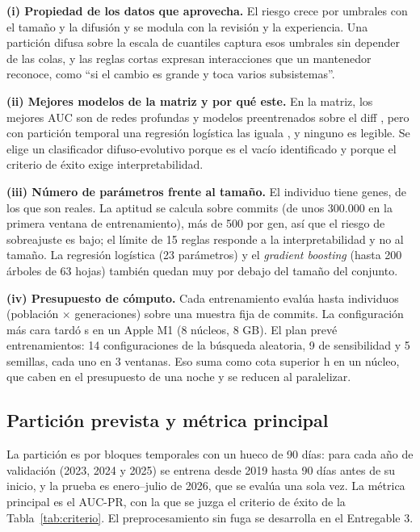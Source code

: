 \textbf{(i) Propiedad de los datos que aprovecha.} El riesgo crece por umbrales con el tamaño y la difusión y se modula con la revisión y la experiencia. Una partición difusa sobre la escala de cuantiles captura esos umbrales sin depender de las colas, y las reglas cortas expresan interacciones que un mantenedor reconoce, como ``si el cambio es grande y toca varios subsistemas''.

\textbf{(ii) Mejores modelos de la matriz y por qué este.} En la matriz, los mejores AUC son de redes profundas y modelos preentrenados sobre el diff \cite{Ni2022}, pero con partición temporal una regresión logística las iguala \cite{Zeng2021}, y ninguno es legible. Se elige un clasificador difuso-evolutivo porque es el vacío identificado y porque el criterio de éxito exige interpretabilidad.

\textbf{(iii) Número de parámetros frente al tamaño.} El individuo tiene \cifGenes{} genes, de los que \cifGenesReales{} son reales. La aptitud se calcula sobre \cifFilasAptitud{} commits (de unos 300.000 en la primera ventana de entrenamiento), más de 500 por gen, así que el riesgo de sobreajuste es bajo; el límite de 15 reglas responde a la interpretabilidad y no al tamaño. La regresión logística (23 parámetros) y el \emph{gradient boosting} (hasta 200 árboles de 63 hojas) también quedan muy por debajo del tamaño del conjunto.

\textbf{(iv) Presupuesto de cómputo.} Cada entrenamiento evalúa hasta \cifEvalAptitud{} individuos (población $\times$ generaciones) sobre una muestra fija de \cifFilasAptitud{} commits. La configuración más cara tardó \cifSegEntrenamiento{} s en un Apple M1 (8 núcleos, 8 GB). El plan prevé \cifNEntrenamientos{} entrenamientos: 14 configuraciones de la búsqueda aleatoria, 9 de sensibilidad y 5 semillas, cada uno en 3 ventanas. Eso suma como cota superior \cifHorasCota{} h en un núcleo, que caben en el presupuesto de una noche y se reducen al paralelizar.

\subsection{Partición prevista y métrica principal}
La partición es por bloques temporales con un hueco de 90 días: para cada año de validación (2023, 2024 y 2025) se entrena desde 2019 hasta 90 días antes de su inicio, y la prueba es enero--julio de 2026, que se evalúa una sola vez. La métrica principal es el AUC-PR, con la que se juzga el criterio de éxito de la Tabla~\ref{tab:criterio}. El preprocesamiento sin fuga se desarrolla en el Entregable 3.
